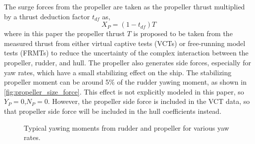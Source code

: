 \noindent The surge forces from the propeller are taken as the propeller thrust multiplied by a thrust deduction factor $t_{df}$ as,
\begin{equation}
    \label{eq:X_P}
    X_P = (1-t_{df})T
\end{equation}
where in this paper the propeller thrust $T$ is proposed to be taken from the measured thrust from either virtual captive tests (VCTs) or free-running model tests (FRMTs) to reduce the uncertainty of the complex interaction between the propeller, rudder, and hull. The propeller also generates side forces, especially for yaw rates, which have a small stabilizing effect on the ship. The stabilizing propeller moment can be around 5\% of the rudder yawing moment, as shown in \autoref{fig:propeller_size_force}.
This effect is not explicitly modeled in this paper, so $Y_P=0$,$N_P=0$. However, the propeller side force is included in the VCT data, so that propeller side force will be included in the hull coefficients instead.

\begin{figure}[h!]
    \centering   
    
    \caption{Typical yawing moments from rudder and propeller for various yaw rates.}
    \label{fig:propeller_size_force}
\end{figure}